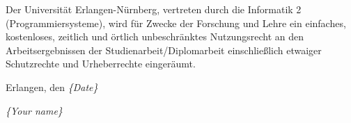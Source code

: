\documentclass[a4paper,12pt,BCOR0mm,headsepline,draft,twoside]{scrbook}
\newcommand{\thethesis}[0]{%
  Studienarbeit/Diplomarbeit
}
\newcommand{\field}[1]{%
  {\itshape \{#1\}}
}
\begin{document}
\vspace{2cm}

Der Universit\"at Erlangen-N\"urnberg, vertreten durch die Informatik 2
(Programmiersysteme), wird f\"ur Zwecke der Forschung und Lehre ein einfaches,
kostenloses, zeitlich und \"ortlich unbeschr\"anktes Nutzungsrecht an den
Arbeitsergebnissen der \thethesis einschlie\ss{}lich etwaiger Schutzrechte und
Urheberrechte einger\"aumt.

\vspace{2cm}
Erlangen, den \field{Date}

\vspace{2cm}
\field{Your name} \hfill \ 

\vspace{0,5cm}

\clearpage{\pagestyle{empty}\cleardoublepage}

\pagestyle{empty}

\pagestyle{headings}


\clearpage{\pagestyle{plain}\cleardoublepage}

\tableofcontents
\listoffigures
\listoftables
\listofalgorithms

\mainmatter




\manualmark
{}
\cleardoublepage

\printindex



\end{document}

